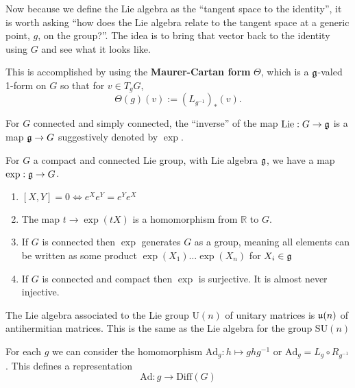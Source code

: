 		
		Now because we define the Lie algebra as the ``tangent space to the identity'', it is worth asking ``how does the Lie algebra relate to the tangent space at a generic point, $g$, on the group?''. The idea is to bring that vector back to the identity using $G$ and see what it looks like. 
		
		This is accomplished by using the \textbf{Maurer-Cartan form} $\Theta$, which is a $\frak g$-valed 1-form on $G$ so that for $v \in T_g G$,
		\begin{equation}
			\Theta(g)(v) := (L_{g^{-1}})_* (v).
		\end{equation}
		
		For $G$ connected and simply connected, the ``inverse'' of the map $\mathrm{Lie}: G \to \frak g$ is a map $\frak g \to G$ suggestively denoted by $\exp$.
		\begin{prop}
			For $G$ a compact and connected Lie group, with Lie algebra $\frak g$, we have a map $\exp : \frak g \rightarrow G$.
			\begin{enumerate}
				\item $[X,Y] = 0 \Leftrightarrow e^X e^Y = e^Y e^X$
				\item The map $t \rightarrow \exp(t X)$ is a homomorphism from $\mathbb R$ to $G$.
				\item If $G$ is connected then $\exp$ generates $G$ as a group, meaning all elements can be written as some product $\exp(X_1) \dots \exp(X_n)$ for $X_i \in \frak g$
				\item If $G$ is connected and compact then $\exp$ is surjective. It is almost never injective.
			\end{enumerate}
		\end{prop}
		
		\begin{eg}
			The Lie algebra associated to the Lie group $\mathrm U(n)$ of unitary matrices is $\frak u(n)$ of antihermitian matrices. This is the same as the Lie algebra for the group $\mathrm{SU}(n)$
		\end{eg}
		
		\begin{defn}
			For each $g$ we can consider the homomorphism $\mathrm{Ad}_g: h \mapsto g h g^{-1}$ or $\mathrm{Ad}_g = L_g \circ R_{g^{-1}}$. This defines a representation
			\[
				\mathrm{Ad}: g \rightarrow \mathrm{Diff}(G)
			\]
		\end{defn}
		
